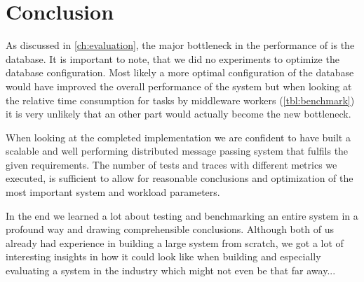 \documentclass[a4paper, oneside]{csthesis}
\begin{document}
\chapter{Conclusion}
    As discussed in \cref{ch:evaluation}, the major bottleneck in the
    performance of \telesto{} is the database. It is important to note, that we
    did no experiments to optimize the database configuration. Most likely a
    more optimal configuration of the database would have improved the overall
    performance of the system but when looking at the relative time consumption
    for tasks by middleware workers (\cref{tbl:benchmark}) it is very unlikely
    that an other part would actually become the new bottleneck.
	
	When looking at the completed \telesto{} implementation we are confident to
	have built a scalable and well performing distributed message passing
	system that fulfils the given requirements. The number of tests and traces with
	different metrics we executed, is sufficient to allow for reasonable
	conclusions and optimization of the most important system and workload
	parameters.
	
	In the end we learned a lot about testing and benchmarking an entire system in
	a profound way and drawing comprehensible conclusions. Although both of us
	already had experience in building a large system from scratch, we got a lot of
	interesting insights in how it could look like when building and especially
	evaluating a system in the industry which might not even be that far away...
	






	
\end{document}
